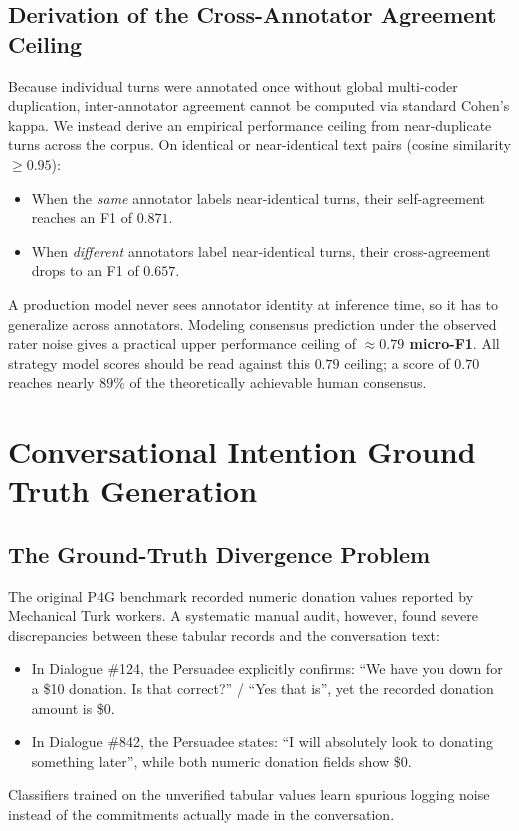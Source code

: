 \subsection{Derivation of the Cross-Annotator Agreement Ceiling}
Because individual turns were annotated once without global multi-coder duplication, inter-annotator agreement cannot be computed via standard Cohen's kappa. We instead derive an empirical performance ceiling from near-duplicate turns across the corpus. On identical or near-identical text pairs (cosine similarity $\ge 0.95$):
\begin{itemize}
  \item When the \textit{same} annotator labels near-identical turns, their self-agreement reaches an F1 of $0.871$.
  \item When \textit{different} annotators label near-identical turns, their cross-agreement drops to an F1 of $0.657$.
\end{itemize}
A production model never sees annotator identity at inference time, so it has to generalize across annotators. Modeling consensus prediction under the observed rater noise gives a practical upper performance ceiling of \textbf{$\approx 0.79$ micro-F1}. All strategy model scores should be read against this $0.79$ ceiling; a score of $0.70$ reaches nearly $89\%$ of the theoretically achievable human consensus.

\section{Conversational Intention Ground Truth Generation}
\label{sec:intention-annotation}

\subsection{The Ground-Truth Divergence Problem}
The original P4G benchmark \cite{wang2019persuasion} recorded numeric donation values reported by Mechanical Turk workers. A systematic manual audit, however, found severe discrepancies between these tabular records and the conversation text:
\begin{itemize}
  \item In Dialogue \#124, the Persuadee explicitly confirms: ``We have you down for a \$10 donation. Is that correct?'' / ``Yes that is'', yet the recorded donation amount is \$0.
  \item In Dialogue \#842, the Persuadee states: ``I will absolutely look to donating something later'', while both numeric donation fields show \$0.
\end{itemize}
Classifiers trained on the unverified tabular values learn spurious logging noise instead of the commitments actually made in the conversation.

